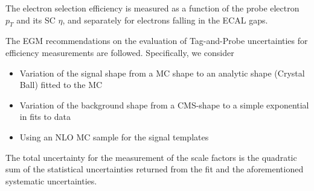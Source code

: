 The electron selection efficiency is measured as a function of the probe electron $p_{T}$ and its SC $\eta$, and separately for electrons falling in the ECAL gaps.




 The EGM recommendations on the evaluation of Tag-and-Probe uncertainties for efficiency measurements are followed. Specifically, we consider

\begin{itemize}
   \item Variation of the signal shape from a MC shape to an analytic shape (Crystal Ball) fitted to the MC
   \item Variation of the background shape from a CMS-shape to a simple exponential in fits to data
   \item Using an NLO MC sample for the signal templates
\end{itemize}

The total uncertainty for the measurement of the scale factors is the quadratic sum of the statistical uncertainties returned from the fit and the aforementioned systematic uncertainties.

